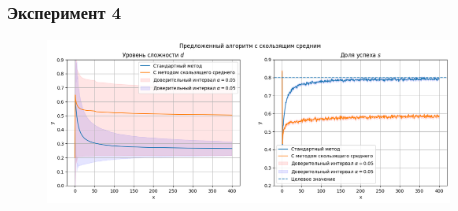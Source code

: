 \subsubsection{Эксперимент 4}
\begin{figure}[h!]
    \centering
    \includegraphics[width=0.95\textwidth]{assets/work/rating/4/adaptive.png}
    \label{exp4:algo}
\end{figure}
